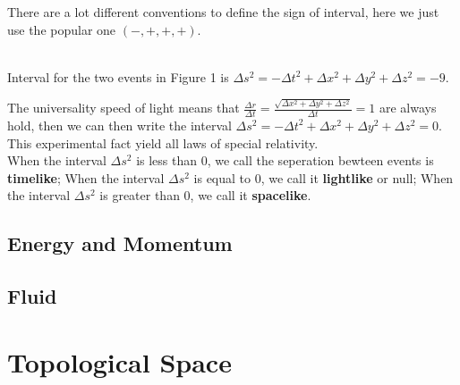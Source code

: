 \documentclass[12pt]{article}
\theoremstyle{mystyle}{\newtheorem{definition}{Definition}[section]}
\theoremstyle{mystyle}{\newtheorem{theorem}[definition]{Theorem}}
\theoremstyle{mystyle}{\newtheorem*{remark}{Remark}}
\theoremstyle{mystyle}{\newtheorem*{example}{Example}}
\theoremstyle{mystyle}{\newtheorem*{examples}{Examples}}
\theoremstyle{cstyle}{\newtheorem*{cthm}{}}
\begin{document}
\begin{remark}\leavevmode
  There are a lot different conventions to define the sign of interval, here we just use the popular one \((-,+,+,+)\).
\end{remark}
\begin{example}\leavevmode %
  \\Interval for the two events in Figure 1 is $\Delta s^2 = - \Delta t^2 + \Delta x^2 + \Delta y^2 + \Delta z^2 = -9$.
\end{example}
The universality speed of light means that $\frac{\Delta r}{\Delta t} = \frac{\sqrt{\Delta x^2+ \Delta y^2 + \Delta z^2}}{\Delta t}=1$
are always hold, then we can then write the interval
$\Delta s^2 = - \Delta t^2 + \Delta x^2 + \Delta y^2 + \Delta z^2 = 0$. This experimental fact yield all laws of special relativity.
\\
When the interval $\Delta s^2$ is less than 0, we call the seperation bewteen events is \textbf{timelike};
When the interval $\Delta s^2$ is equal to 0, we call it \textbf{lightlike} or null;
When the interval $\Delta s^2$ is greater than 0, we call it \textbf{spacelike}.


\subsection{Energy and Momentum}
\subsection{Fluid}


\section{Topological Space}
\end{document}
